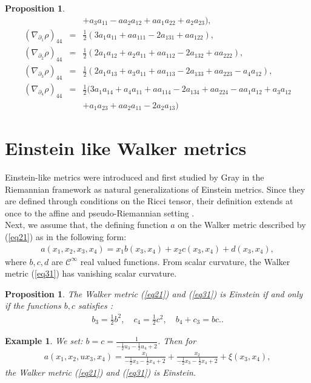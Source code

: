 \documentclass[reqno, 12pt]{amsart}
\numberwithin{equation}{section}
\newtheorem{proposition}[theorem]{Proposition}
\newtheorem{example}[theorem]{Example}
\begin{document}
\begin{proposition}
\begin{eqnarray*}
&& +a_3a_{11} - aa_2a_{12} + aa_1a_{22}+a_2a_{23}),\\
(\nabla_{\partial_1}\rho)_{44} &=& \frac{1}{2}(3a_1a_{11}+aa_{111}-2a_{131}+aa_{122}),\\
(\nabla_{\partial_2}\rho)_{44} &=& \frac{1}{2}(2a_1a_{12} + a_2a_{11}
+ aa_{112} - 2a_{132} + aa_{222}),\\  
(\nabla_{\partial_3}\rho)_{44} &=& \frac{1}{2}( 2a_1a_{13} + a_3a_{11}
+ aa_{113} - 2a_{133} + aa_{223} - a_4a_{12}),\\
(\nabla_{\partial_4}\rho)_{44} &=& \frac{1}{2}(3a_1a_{14} + a_4a_{11}
+ aa_{114} - 2a_{134} + aa_{224} - aa_1a_{12} + a_3a_{12}\\
&& + a_1a_{23} + aa_2a_{11} - 2a_2a_{13})
\end{eqnarray*}
\end{proposition}


\section{Einstein like Walker metrics}\label{Einsteinlike}

Einstein-like metrics were introduced and first studied by Gray \cite{Gray1978} in the Riemannian framework as natural generalizations 
of Einstein metrics. Since they are defined through conditions 
on the Ricci tensor, their definition extends at once to the 
affine and pseudo-Riemannian setting \cite{Diallo2023}. \\

Next, we assume that, the defining function $a$ on the Walker metric described by (\ref{eq21}) as in the following form:
\begin{eqnarray}\label{eq31}
a(x_1,x_2,x_3,x_4)=x_1b(x_3,x_4) + x_2c(x_3,x_4) + d(x_3,x_4),
\end{eqnarray}
 where $ b, c, d$ are $\mathcal{C}^{\infty}$ real valued functions. 
From scalar curvature, the Walker metric (\ref{eq31}) has vanishing
scalar curvature.

\begin{proposition}
The Walker metric (\ref{eq21}) and (\ref{eq31}) is Einstein if and only 
if the functions $b, c$ satisfies :
\begin{eqnarray*}
b_3 = \frac{1}{2}b^2, \quad
c_4 = \frac{1}{2}c^2, \quad
b_4 + c_3 = bc..
\end{eqnarray*}
\end{proposition}

\begin{example}
We set: $ b=c= \frac{1}{-\frac{1}{2}u_3 - \frac{1}{2}u_4 + 2 }$. Then
for		 
\begin{eqnarray*}
a(x_1, x_2, ux_3, x_4) = \frac{x_1}{-\frac{1}{2}x_3 - \frac{1}{2}x_4 + 2 } 
+ \frac{x_2}{-\frac{1}{2}x_3 - \frac{1}{2}x_4 + 2 } + \xi(x_3, x_4),
\end{eqnarray*}
the Walker metric (\ref{eq21}) and (\ref{eq31}) is Einstein.
\end{example}
 
\end{document}
